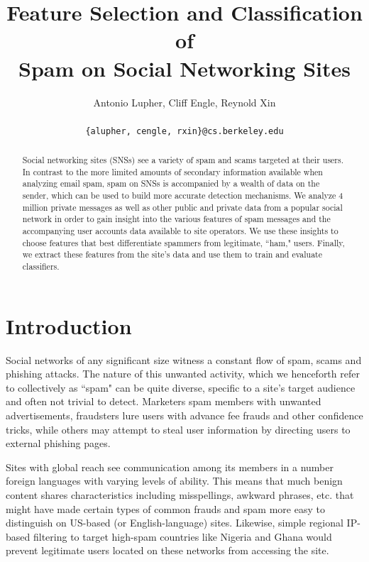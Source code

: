\documentclass[preprint]{acm_proc_article-sp}
\begin{document}
\title{Feature Selection and Classification of \\
    Spam on Social Networking Sites}

\author{
Antonio Lupher,
Cliff Engle,
Reynold Xin\\\\
\texttt{\{alupher, cengle, rxin\}@cs.berkeley.edu}
}


\maketitle
\begin{abstract}
Social networking sites (SNSs) see a variety of spam and scams targeted at 
their users. In contrast to the more limited amounts of secondary information 
available when analyzing email spam, spam on SNSs is accompanied by a wealth 
of data on the sender, which can be used to build more accurate detection mechanisms. 
We analyze 4 million private messages as well as other public and private data from 
a popular social network in order to gain insight into the various features of 
spam messages and the accompanying user accounts data available to site operators. 
We use these insights to choose features that best differentiate spammers from 
legitimate, ``ham," users.  Finally, we extract these features from the site's data 
and use them to train and evaluate classifiers.
\end{abstract}


\maketitle

\section{Introduction}

Social networks of any significant size witness a constant flow of spam, scams and phishing attacks. 
The nature of this unwanted activity, which we henceforth refer to collectively as ``spam" can be 
quite diverse, specific to a site's target audience and often not trivial to detect. Marketers 
spam members with unwanted advertisements, fraudsters lure users with advance fee frauds and 
other confidence tricks, while others may attempt to steal user information by directing users 
to external phishing pages. 

Sites with global reach see communication among its members in a number foreign languages with 
varying levels of ability. This means that much benign content shares characteristics including 
misspellings, awkward phrases, etc. that might have made certain types of common frauds and spam 
more easy to distinguish on US-based (or English-language) sites. Likewise, simple regional IP-based 
filtering to target high-spam countries like Nigeria and Ghana would prevent legitimate users 
located on these networks from accessing the site.
\end{document}
